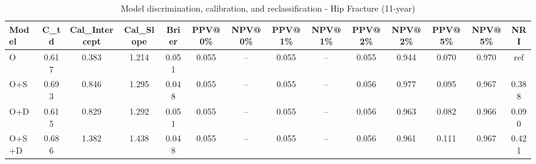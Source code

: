 \begin{table}[htbp]
\centering
\small
\caption{Model discrimination, calibration, and reclassification - Hip Fracture (11-year)}
\label{tab:perf_pd_11y}
\begin{tabular}{lccccccccccccc}
\toprule
Model & C\_td & Cal\_Intercept & Cal\_Slope & Brier & PPV@0\% & NPV@0\% & PPV@1\% & NPV@1\% & PPV@2\% & NPV@2\% & PPV@5\% & NPV@5\% & NRI \\
\midrule
O & 0.617 & 0.383 & 1.214 & 0.051 & 0.055 & -- & 0.055 & -- & 0.055 & 0.944 & 0.070 & 0.970 & ref \\
O+S & 0.693 & 0.846 & 1.295 & 0.048 & 0.055 & -- & 0.055 & -- & 0.056 & 0.977 & 0.095 & 0.967 & 0.388 \\
O+D & 0.615 & 0.829 & 1.292 & 0.051 & 0.055 & -- & 0.055 & -- & 0.056 & 0.963 & 0.082 & 0.966 & 0.090 \\
O+S+D & 0.686 & 1.382 & 1.438 & 0.048 & 0.055 & -- & 0.055 & -- & 0.056 & 0.961 & 0.111 & 0.967 & 0.421 \\
\bottomrule
\end{tabular}
\end{table}